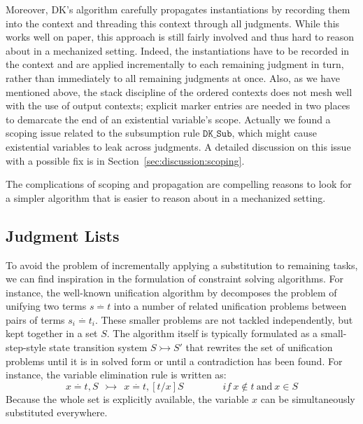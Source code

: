 Moreover, DK's algorithm carefully propagates instantiations by recording them
into the context and threading this context through all judgments. 
While this works well on paper, this approach is still fairly involved and thus
hard to reason about in a mechanized setting. Indeed, the instantiations have
to be recorded in the context and are applied incrementally to each remaining
judgment in turn, rather than immediately to all remaining judgments at once.
Also, as we have mentioned above, the stack discipline of the ordered contexts
does not mesh well with the use of output contexts; explicit marker entries are
needed in two places to demarcate the end of an existential variable's scope.
Actually we found a scoping issue related to the subsumption rule $\mathtt{DK\_Sub}$,
which might cause existential variables to leak across judgments.
A detailed discussion on this issue with a possible fix is in Section~\ref{sec:discussion:scoping}.

The complications of scoping and propagation are compelling reasons
to look for a simpler algorithm that is easier to
reason about in a mechanized setting.


\subsection{Judgment Lists}\label{sec:overview:list}

To avoid the problem of incrementally applying a substitution to remaining
tasks, we can find inspiration in the formulation of constraint solving
algorithms. For instance, the well-known unification
algorithm by \citet{unification} decomposes the problem of unifying two terms $s \stackrel{.}{=} t$ into a number
of related unification problems between pairs of terms $s_i \stackrel{.}{=} t_i$. These smaller
problems are not tackled independently, but kept together in a set $S$. 
The algorithm itself is typically formulated as a small-step-style state
transition system $S \rightarrowtail S'$ that rewrites the set of unification
problems until it is in solved form or until a contradiction has been found.
For instance, the variable elimination rule is written as:
\[
   x \stackrel{.}{=} t, S  ~~\rightarrowtail~~  x \stackrel{.}{=} t, [t/x]S   \qquad\qquad{if}~x \not\in t~\text{and}~{x \in S}
\]
Because the whole set is explicitly available, the variable $x$ can be
simultaneously substituted everywhere.

